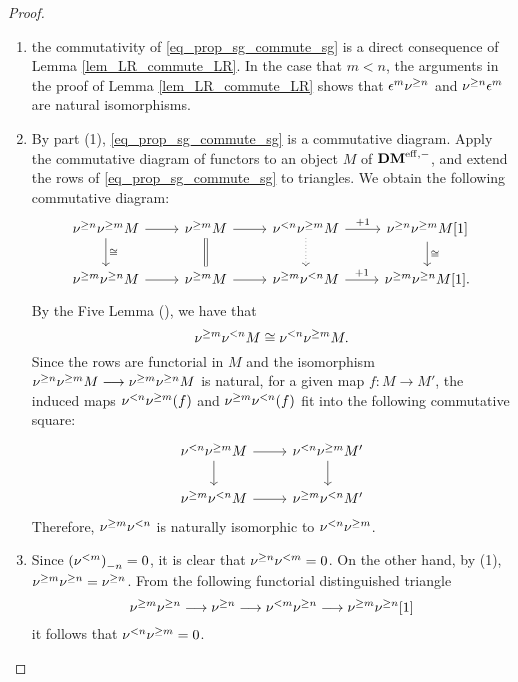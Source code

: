 \begin{proof}
\begin{enumerate}
\item the commutativity of \eqref{eq_prop_sg_commute_sg} is a
direct consequence of Lemma \ref{lem_LR_commute_LR}. In the
case that $m < n$, the arguments in the proof of Lemma 
\ref{lem_LR_commute_LR} shows that $\epsilon^m \sgDM{n}$ and
$\sgDM{n} \epsilon^m$ are natural isomorphisms.

\item By part (1), \eqref{eq_prop_sg_commute_sg} is a commutative
diagram. Apply the commutative diagram of functors to an object
$M$ of $\DMeff$, and extend the rows of 
\eqref{eq_prop_sg_commute_sg} to triangles. We obtain the 
following commutative diagram:
\[
\begin{tikzcd}
\sgDM{n} \sgDM{m} M \arrow{r} \arrow{d}{\cong} &
\sgDM{m} M \arrow{r} \arrow[equals]{d} &
\slDM{n} \sgDM{m} M \arrow{r}{+1} \arrow[dotted]{d} &
\sgDM{n} \sgDM{m} M[1] \arrow{d}{\cong}\\
\sgDM{m} \sgDM{n} M \arrow{r} &
\sgDM{m} M \arrow{r} &
\sgDM{m} \slDM{n} M \arrow{r}{+1} &
\sgDM{m} \sgDM{n} M[1].
\end{tikzcd}
\]
By the Five Lemma (\cite[10.2.2]{WH}), we have that
\[
\sgDM{m}\slDM{n} M \cong \slDM{n}\sgDM{m} M.
\]
Since the rows are functorial in $M$ and the isomorphism
$\sgDM{n} \sgDM{m} M \to \sgDM{m}\sgDM{n} M$ is natural,
for a given map $f: M \to M'$, the induced maps 
$\slDM{n}\sgDM{m}(f)$ and $\sgDM{m}\slDM{n}(f)$ fit into the 
following commutative square:
\[
\begin{tikzcd}
\slDM{n} \sgDM{m} M \arrow{r} \arrow{d}
&\slDM{n} \sgDM{m} M' \arrow{d} \\
\sgDM{m}\slDM{n} M \arrow{r} &
\sgDM{m}\slDM{n} M'
\end{tikzcd}
\]
Therefore, $\sgDM{m} \slDM{n}$ is naturally isomorphic to 
$\slDM{n} \sgDM{m}$.

\item Since $\hZ[n]{(\slDM{m})} = 0$, it is clear that
$\sgDM{n}\slDM{m} = 0$. On the other hand, by (1), $\sgDM{m}\sgDM{n}
= \sgDM{n}$. From the following functorial distinguished triangle
\[
\sgDM{m} \sgDM{n} \to \sgDM{n} \to \slDM{m} \sgDM{n} \to \sgDM{m} 
   \sgDM{n}[1]
\]
it follows that $\slDM{n} \sgDM{m} = 0$.


\end{enumerate}
\end{proof}
